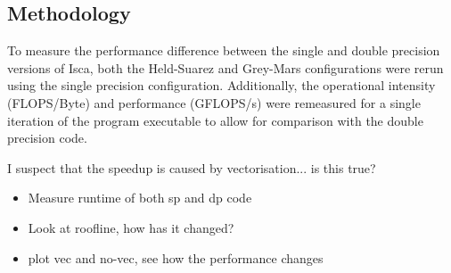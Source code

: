 \documentclass[a4paper,11pt]{report}
\begin{document}
\subsection{Methodology}
To measure the performance difference between the single and double precision versions of Isca, both the Held-Suarez and Grey-Mars configurations were rerun using the single precision configuration. Additionally, the operational intensity (FLOPS/Byte) and performance (GFLOPS/s) were remeasured for a single iteration of the program executable to allow for comparison with the double precision code. 
\par
I suspect that the speedup is caused by vectorisation... is this true?
\begin{itemize}
	\item Measure runtime of both sp and dp code
	\item Look at roofline, how has it changed? 
	\item plot vec and no-vec, see how the performance changes
\end{itemize}
\end{document}
